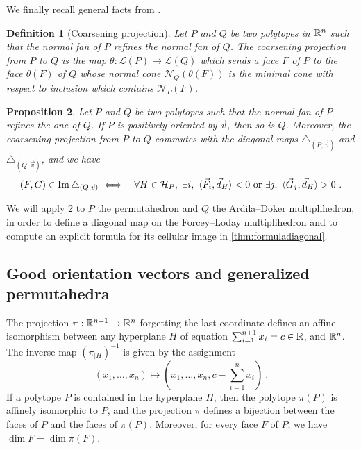 \documentclass[10pt]{amsart}
\newtheorem{definition}{Definition}[section]
\newtheorem{proposition}[definition]{Proposition}
\theoremstyle{remark}
\begin{document}
We finally recall general facts from \cite[Section 1.6]{LA21}. 

\begin{definition}[Coarsening projection] 
  \label{def:coarseningprojection} 
  Let $P$ and $Q$ be two polytopes in $\mathbb{R}^n$ such that the normal fan of $P$ refines the normal fan of $Q$. 
  The \emph{coarsening projection} from $P$ to $Q$ is the map $\theta : \mathcal{L}(P)\to\mathcal{L}(Q)$ which sends a face $F$ of $P$ to the face $\theta(F)$ of $Q$ whose normal cone $\mathcal{N}_Q(\theta(F))$ is the minimal cone with respect to inclusion which contains $\mathcal{N}_P(F)$.
\end{definition}

\begin{proposition} 
\label{prop:refinementofnormalfans}
Let $P$ and $Q$ be two polytopes such that the normal fan of $P$ refines the one of $Q$. 
If $P$ is positively oriented by $\vec v$, then so is $Q$. 
Moreover, the coarsening projection from $P$ to $Q$ commutes with the diagonal maps $\triangle_{(P,\vec v)}$ and $\triangle_{(Q,\vec v)}$, and we have 
\begin{eqnarray*}
  (F,G) \in \operatorname{Im} \triangle_{(Q,\vec v)} 
  &\iff& \forall H \in \mathcal{H}_P , \ \exists i , \ \langle \vec F_i, \vec d_H \rangle < 0  \text{ or } \exists j , \ \langle \vec G_j, \vec d_H \rangle > 0 \ .
\end{eqnarray*} 
\end{proposition}

We will apply \cref{prop:refinementofnormalfans} to $P$ the permutahedron and $Q$ the Ardila--Doker multiplihedron, in order to define a diagonal map on the Forcey--Loday multiplihedron and to compute an explicit formula for its cellular image in \cref{thm:formuladiagonal}.


\subsection{Good orientation vectors and generalized permutahedra}

The projection $\pi : \mathbb{R}^{n+1} \to \mathbb{R}^n$ forgetting the last coordinate defines an affine isomorphism between any hyperplane $H$ of equation $\sum_{i=1}^{n+1} x_i = c \in \mathbb{R}$, and $\mathbb{R}^n$. 
The inverse map $(\pi_{| H})^{-1}$ is given by the assignment \[ (x_1, \ldots, x_n) \mapsto \left(x_1, \ldots, x_n, c- \sum_{i=1}^{n}x_i\right) \ . \]
If a polytope $P$ is contained in the hyperplane $H$, then the polytope $\pi(P)$ is affinely isomorphic to $P$, and the projection $\pi$ defines a bijection between the faces of $P$ and the faces of $\pi(P)$. Moreover, for every face $F$ of $P$, we have $\dim F = \dim \pi(F)$.
\end{document}
